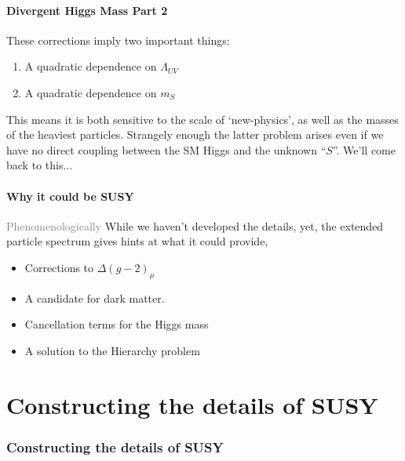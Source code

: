 \documentclass{beamer}
\begin{document}
\subsection{Divergent Higgs Mass Part 2}
\begin{frame}{\insertsubsection}
  These corrections imply two important things:
  \begin{enumerate}
    \item A quadratic dependence on $\Lambda_{UV}$
    \item A quadratic dependence on $m_{S}$
  \end{enumerate}
  This means it is both sensitive to the scale of `new-physics', as well as the
  masses of the heaviest particles.  Strangely enough the latter problem arises
  even if we have no direct coupling between the SM Higgs and the unknown
  ``$S$''.
  \vfill\hfill We'll come back to this...
\end{frame}

\subsection{Why it could be SUSY}
\begin{frame}{\insertsubsection}
  \textcolor{gray}{Phenomenologically}
  While we haven't developed the details, yet, the extended particle spectrum
  gives hints at what it \alert{could} provide,
  \begin{itemize}
    \item Corrections to $\Delta(g-2)_{\mu}$
    \item A candidate for dark matter.
    \item Cancellation terms for the Higgs mass
    \item A solution to the Hierarchy problem
  \end{itemize}
\end{frame}


\part{Constructing the details of SUSY}
\frame{\partpage}
\section{Constructing the details of SUSY}
\end{document}
